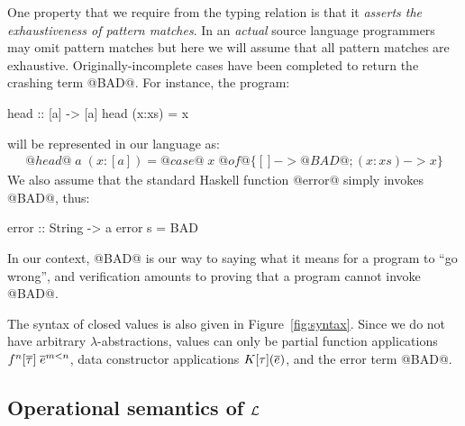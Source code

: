 One property that we require from the typing relation is
that it {\em asserts the exhaustiveness of pattern matches}. In an
{\em actual} source language programmers may omit pattern matches but
here we will assume that all pattern matches are
exhaustive. Originally-incomplete cases have been completed to return
the crashing term @BAD@. For instance, the program:
\begin{code}
head :: [a] -> [a]
head (x:xs) = x
\end{code}
will be represented in our language as:
\[\begin{array}{l}
   @head@\; a\; (x{:}[a]) = @case@\;x\;@of@ \{ [] -> @BAD@ ; (x:xs) -> x \}
\end{array}\]
We also assume that the standard Haskell function @error@ simply invokes @BAD@, thus:
\begin{code}
  error :: String -> a
  error s = BAD
\end{code}
In our context, @BAD@ is our way to saying what it means for a program to ``go wrong'',
and verification amounts to proving that a program cannot invoke @BAD@.

The syntax of closed values is also given in Figure~\ref{fig:syntax}. Since we do not
have arbitrary $\lambda$-abstractions, values can only be partial function applications
$f^n[\overline{\tau}]\;\overline{e}^{m < n}$, data constructor applications $K[\tau](\overline{e})$,
and the error term @BAD@.

\subsection{Operational semantics of $\cal L$}

